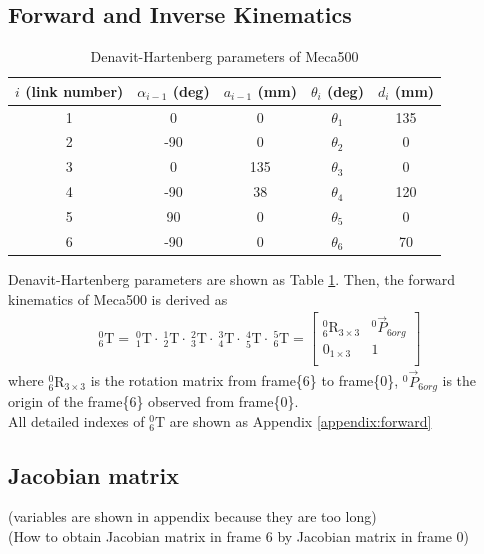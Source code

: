\subsection{Forward and Inverse Kinematics}
\label{sec:forward}
\begin{table}[H]
\centering
\caption{Denavit-Hartenberg parameters of Meca500}
\label{tab:DHtable}
\begin{tabular}{ccccc} 
\hline \hline
$i$ (link number)		&$\alpha _{i-1}$ (deg)	&$a_{i-1}$ (mm)	& $\theta _i$ (deg)			&$d_i$ (mm)	\\\hline
1   					&0    					&0				&$\theta _1$				&135 \\
2   					&-90   					&0				&$\theta _2$				&0 \\
3  						&0    					&135			&$\theta _3$ 				&0 \\
4   					&-90    				&38				&$\theta _4$ 				&120 \\
5   					&90   					&0				&$\theta _5$ 				&0 \\
6						&-90  					&0				&$\theta _6$ 				&70 \\
\end{tabular}
\end{table}
Denavit-Hartenberg parameters are shown as Table \ref{tab:DHtable}. Then, the forward kinematics of Meca500 is derived as
\begin{equation*}
\begin{split}
^0_6\text{T} =
\ ^0_1\text{T} \cdot \ ^1_2\text{T} \cdot \ ^2_3\text{T} \cdot \ ^3_4\text{T} \cdot \ ^4_5\text{T} \cdot \ ^5_6\text{T} =
\begin{bmatrix}
^0_6\text{R}_{3\times 3} 	&^0\vec{P}_{6org}\\
0_{1\times 3}				&1\\
\end{bmatrix}
\end{split}
\end{equation*}
where $^0_6\text{R}_{3\times 3}$ is the rotation matrix from frame\{6\} to frame\{0\}, $^0\vec{P}_{6org}$ is the origin of the frame\{6\} observed from frame\{0\}.\\
All detailed indexes of $^0_6\text{T}$ are shown as Appendix \ref{appendix:forward}

\subsection{Jacobian matrix} 
\label{sec:jacobian}
(variables are shown in appendix because they are too long)												\\
(How to obtain Jacobian matrix in frame 6 by Jacobian matrix in frame 0)
